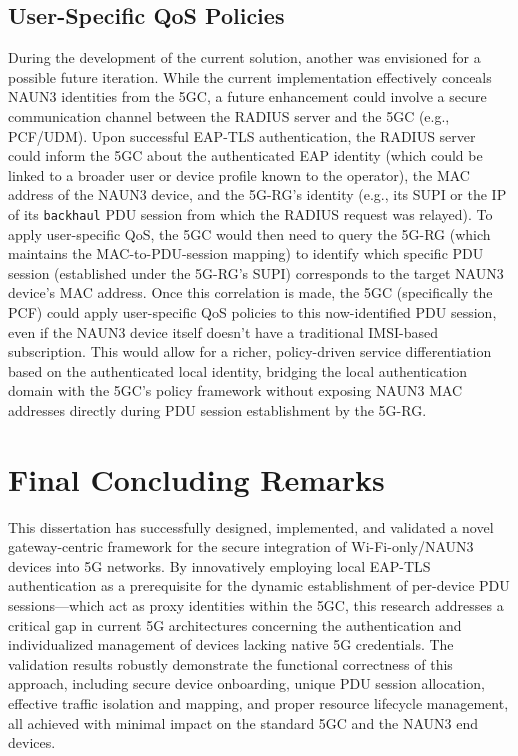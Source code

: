 \subsection{User-Specific \acs{QoS} Policies}

During the development of the current solution, another was envisioned for a possible future iteration. While the current implementation effectively conceals \ac{NAUN3} identities from the \ac{5GC}, a future enhancement could involve a secure communication channel between the \ac{RADIUS} server and the \ac{5GC} (e.g., \ac{PCF}/\ac{UDM}). Upon successful \ac{EAP-TLS} authentication, the \ac{RADIUS} server could inform the \ac{5GC} about the authenticated \ac{EAP} identity (which could be linked to a broader user or device profile known to the operator), the \ac{MAC} address of the \ac{NAUN3} device, and the \ac{5G-RG}'s identity (e.g., its \ac{SUPI} or the \ac{IP} of its \texttt{backhaul} \ac{PDU} session from which the \ac{RADIUS} request was relayed). To apply user-specific \ac{QoS}, the \ac{5GC} would then need to query the \ac{5G-RG} (which maintains the \ac{MAC}-to-\ac{PDU}-session mapping) to identify which specific \ac{PDU} session (established under the \ac{5G-RG}'s \ac{SUPI}) corresponds to the target \ac{NAUN3} device's \ac{MAC} address. Once this correlation is made, the \ac{5GC} (specifically the \ac{PCF}) could apply user-specific \ac{QoS} policies to this now-identified \ac{PDU} session, even if the \ac{NAUN3} device itself doesn't have a traditional \ac{IMSI}-based subscription. This would allow for a richer, policy-driven service differentiation based on the authenticated local identity, bridging the local authentication domain with the \ac{5GC}'s policy framework without exposing \ac{NAUN3} \ac{MAC} addresses directly during \ac{PDU} session establishment by the \ac{5G-RG}.

\section{Final Concluding Remarks}

This dissertation has successfully designed, implemented, and validated a novel gateway-centric framework for the secure integration of Wi-Fi-only/\ac{NAUN3} devices into \ac{5G} networks. By innovatively employing local \ac{EAP-TLS} authentication as a prerequisite for the dynamic establishment of per-device \ac{PDU} sessions—which act as proxy identities within the \ac{5GC}, this research addresses a critical gap in current \ac{5G} architectures concerning the authentication and individualized management of devices lacking native \ac{5G} credentials. The validation results robustly demonstrate the functional correctness of this approach, including secure device onboarding, unique \ac{PDU} session allocation, effective traffic isolation and mapping, and proper resource lifecycle management, all achieved with minimal impact on the standard \ac{5GC} and the \ac{NAUN3} end devices.

